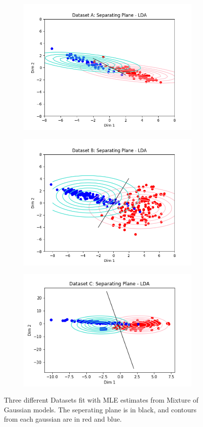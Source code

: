 \documentclass[paper=a4, fontsize=11pt]{scrartcl} %
\numberwithin{equation}{section} %
\numberwithin{figure}{section} %
\numberwithin{table}{section} %
\begin{document}
	\begin{figure}
	\begin{subfigure}{.5\textwidth}
		\centering
		\includegraphics[width=.9\linewidth]{img_A_MoG.png}
	\end{subfigure}
	\begin{subfigure}{.5\textwidth}
		\centering
		\includegraphics[width=.9\linewidth]{img_B_MoG.png}
	\end{subfigure}
	\begin{subfigure}{.5\textwidth}
		\centering
		\includegraphics[width=.9\linewidth]{img_C_MoG.png}
	\end{subfigure}
	\caption{Three different Datasets fit with MLE estimates from Mixture of Gaussian models. The seperating plane is in black, and contours from each gaussian are in red and blue.}
	\end{figure}
\end{document}

